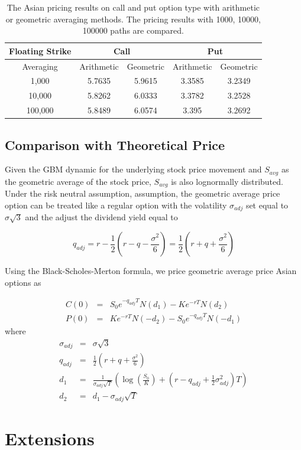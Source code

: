 \documentclass[a4paper,11pt] {article}
\begin{document}
\begin{table}[htb]
\begin{center}
\begin{tabular}{c||c|c|c|c}
  \hline
  Floating Strike & \multicolumn{2}{c|}{Call} & \multicolumn{2}{c}{Put} \\ \hline
  Averaging & Arithmetic & Geometric & Arithmetic & Geometric \\ \hline
  1,000 & 5.7635 & 5.9615 & 3.3585 & 3.2349 \\
  10,000 & 5.8262 & 6.0333 & 3.3782 & 3.2528 \\
  100,000 & 5.8489 & 6.0574 & 3.395 & 3.2692 \\
  \hline
\end{tabular}
\caption{The Asian pricing results on call and put option type with arithmetic or geometric averaging methods. The pricing results with 1000, 10000, 100000 paths are compared.}
\label{table:floating_strike}
\end{center}
\end{table}

\subsection{Comparison with Theoretical Price}
Given the GBM dynamic for the underlying stock price movement and $S_{avg}$ as the geometric average of the stock price, $S_{avg}$ is also lognormally distributed. Under the risk neutral assumption, assumption, the geometric average price option can be treated like a regular option with the volatility $\sigma_{adj}$ set equal to $\sigma\sqrt{3}$ and the adjust the dividend yield equal to

$$
q_{adj} = r - \frac{1}{2} (r-q-\frac{\sigma^2}{6}) = \frac{1}{2} (r+q+\frac{\sigma^2}{6})
$$ 

Using the Black-Scholes-Merton formula, we price geometric average price Asian options as 

\begin{eqnarray*}
C(0) &=& S_0 e^{-q_{adj}T} N(d_1) - Ke^{-rT}N(d_2) \\
P(0) &=& Ke^{-rT}N(-d_2) - S_0 e^{-q_{adj}T} N(-d_1)
\end{eqnarray*}
where
\begin{eqnarray*}
\sigma_{adj} &=& \sigma\sqrt{3} \\
q_{adj} &=& \frac{1}{2} (r+q+\frac{\sigma^2}{6}) \\
d_1 &=& \frac{1}{\sigma_{adj}\sqrt{T}}\left( \log(\frac{S_0}{K})+ (r-q_{adj}+\frac{1}{2}\sigma_{adj}^2)T\right) \\
d_2 &=& d_1 - \sigma_{adj}\sqrt{T}
\end{eqnarray*}

\section{Extensions}

%
\end{document}
